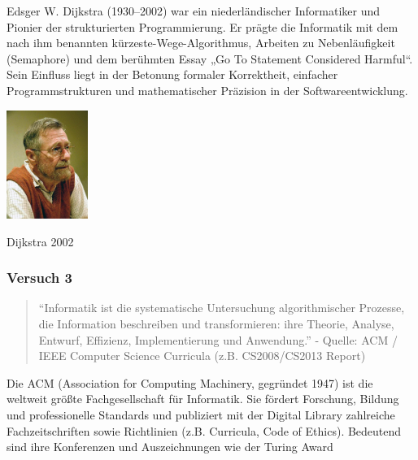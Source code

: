\documentclass[
  11pt,
  a4paper,
  DIV=11,
  numbers=noendperiod]{scrartcl}
\begin{document}
\begin{tcolorbox}[enhanced jigsaw, left=2mm, bottomtitle=1mm, breakable, toptitle=1mm, colbacktitle=quarto-callout-tip-color!10!white, bottomrule=.15mm, colframe=quarto-callout-tip-color-frame, toprule=.15mm, title=\textcolor{quarto-callout-tip-color}{\faLightbulb}\hspace{0.5em}{INFO}, colback=white, titlerule=0mm, coltitle=black, opacityback=0, arc=.35mm, rightrule=.15mm, opacitybacktitle=0.6, leftrule=.75mm]

Edsger W. Dijkstra (1930--2002) war ein niederländischer Informatiker
und Pionier der strukturierten Programmierung. Er prägte die Informatik
mit dem nach ihm benannten kürzeste-Wege-Algorithmus, Arbeiten zu
Nebenläufigkeit (Semaphore) und dem berühmten Essay „Go To Statement
Considered Harmful``. Sein Einfluss liegt in der Betonung formaler
Korrektheit, einfacher Programmstrukturen und mathematischer Präzision
in der Softwareentwicklung.

\includegraphics[width=1.04167in,height=\textheight,keepaspectratio]{images/dijkstra.jpg}

Dijkstra 2002

\end{tcolorbox}

\subsubsection{Versuch 3}\label{versuch-3}

\begin{quote}
``Informatik ist die systematische Untersuchung algorithmischer
Prozesse, die Information beschreiben und transformieren: ihre Theorie,
Analyse, Entwurf, Effizienz, Implementierung und Anwendung.'' - Quelle:
ACM / IEEE Computer Science Curricula (z.B. CS2008/CS2013 Report)
\end{quote}

\begin{tcolorbox}[enhanced jigsaw, left=2mm, bottomtitle=1mm, breakable, toptitle=1mm, colbacktitle=quarto-callout-tip-color!10!white, bottomrule=.15mm, colframe=quarto-callout-tip-color-frame, toprule=.15mm, title=\textcolor{quarto-callout-tip-color}{\faLightbulb}\hspace{0.5em}{INFO}, colback=white, titlerule=0mm, coltitle=black, opacityback=0, arc=.35mm, rightrule=.15mm, opacitybacktitle=0.6, leftrule=.75mm]

Die ACM (Association for Computing Machinery, gegründet 1947) ist die
weltweit größte Fachgesellschaft für Informatik. Sie fördert Forschung,
Bildung und professionelle Standards und publiziert mit der Digital
Library zahlreiche Fachzeitschriften sowie Richtlinien (z.B. Curricula,
Code of Ethics). Bedeutend sind ihre Konferenzen und Auszeichnungen wie
der Turing Award

\end{tcolorbox}
\end{document}
